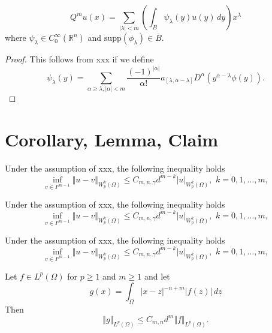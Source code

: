 \documentclass[fontset=none]{ctexart}
\begin{document}
\begin{proposition*}
    \begin{equation*}
        Q^m u(x) = \sum_{|\lambda| < m} \left( \int_B \psi_\lambda(y) u(y)\,dy \right) x^\lambda
    \end{equation*}
    where $\psi_\lambda \in C_0^\infty(\mathbb{R}^n)$ and $\mathrm{supp}(\phi_\lambda) \in \overline{B}$.
\end{proposition*}
\begin{proof}
    This follows from xxx if we define
    \begin{equation*}
        \psi_\lambda(y) = \sum_{\alpha \ge \lambda,|\alpha|<m}
        \frac{(-1)^{|\alpha|}}{\alpha !} a_{[\lambda,\alpha-\lambda]} D^\alpha(y^{\alpha-\lambda} \phi(y)).
    \end{equation*}
\end{proof}

\section{Corollary, Lemma, Claim}

\begin{corollary}
    Under the assumption of xxx, the following inequality holds
    \begin{equation*}
        \inf_{v \in P^{m-1}} \Vert u - v \Vert_{W^k_p(\Omega)} \le C_{m,n,\gamma} d^{m-k} |u|_{W^k_p(\Omega)}, \,\, k = 0,1,\dots,m,
    \end{equation*}
\end{corollary}

\begin{corollary}[xxx]
    Under the assumption of xxx, the following inequality holds
    \begin{equation*}
        \inf_{v \in P^{m-1}} \Vert u - v \Vert_{W^k_p(\Omega)} \le C_{m,n,\gamma} d^{m-k} |u|_{W^k_p(\Omega)}, \,\, k = 0,1,\dots,m,
    \end{equation*}
\end{corollary}

\begin{corollary*}
    Under the assumption of xxx, the following inequality holds
    \begin{equation*}
        \inf_{v \in P^{m-1}} \Vert u - v \Vert_{W^k_p(\Omega)} \le C_{m,n,\gamma} d^{m-k} |u|_{W^k_p(\Omega)}, \,\, k = 0,1,\dots,m,
    \end{equation*}
\end{corollary*}

\begin{lemma}
    Let $f \in L^p(\Omega)$ for $p \ge 1$ and $m \ge 1$ and let
    \[
        g(x) = \int_\Omega |x-z|^{-n+m} |f(z)|\,dz
    \]
    Then
    \begin{equation*}
        \Vert g \Vert_{L^p(\Omega)} \le C_{m,n} d^m \Vert f\Vert_{L^p(\Omega)}.
    \end{equation*}
\end{lemma}
\end{document}
